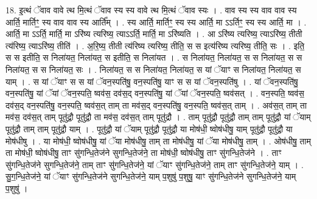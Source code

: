 \documentclass[17pt]{extarticle}
\begin{document}
18. इ॒त्थं ॅवाव वावे त्थ मि॒त्थं ॅवाव स्य स्य वावे त्थ मि॒त्थं ॅवाव स्यः । . वाव स्य स्य वाव वाव स्य आर्ति॒ मार्तिꣳ॒॒ स्य वाव वाव स्य आर्ति᳚म् । . स्य आर्ति॒ मार्तिꣳ॒॒ स्य स्य आर्ति॒ मा ऽऽर्तिꣳ॒॒ स्य स्य आर्ति॒ मा । . आर्ति॒ मा ऽऽर्ति॒ मार्ति॒ मा ऽरि॑ष्य त्यरिष्य॒ त्याऽऽर्ति॒ मार्ति॒ मा ऽरि॑ष्यति । . आ ऽरि॑ष्य त्यरिष्य॒ त्याऽरि॑ष्य॒ तीती त्य॑रिष्य॒ त्याऽरि॑ष्य॒ तीति॑ । . अ॒रि॒ष्य॒ तीती त्य॑रिष्य त्यरिष्य॒ तीति॒ स स इत्य॑रिष्य त्यरिष्य॒ तीति॒ सः । . इति॒ स स इतीति॒ स निला॑यत॒ निला॑यत॒ स इतीति॒ स निला॑यत । . स निला॑यत॒ निला॑यत॒ स स निला॑यत॒ स स निला॑यत॒ स स निला॑यत॒ सः । . निला॑यत॒ स स निला॑यत॒ निला॑यत॒ स यां ॅयाꣳ स निला॑यत॒ निला॑यत॒ स याम् । . स यां ॅयाꣳ स स यां ॅवन॒स्पति॑षु॒ वन॒स्पति॑षु॒ याꣳ स स यां ॅवन॒स्पति॑षु । . यां ॅवन॒स्पति॑षु॒ वन॒स्पति॑षु॒ यां ॅयां ॅवन॒स्पति॒ ष्वव॑स॒ दव॑स॒द् वन॒स्पति॑षु॒ यां ॅयां ॅवन॒स्पति॒ ष्वव॑सत् । . वन॒स्पति॒ ष्वव॑स॒ दव॑स॒द् वन॒स्पति॑षु॒ वन॒स्पति॒ ष्वव॑स॒त् ताम् ता मव॑स॒द् वन॒स्पति॑षु॒ वन॒स्पति॒ ष्वव॑स॒त् ताम् । . अव॑स॒त् ताम् ता मव॑स॒ दव॑स॒त् ताम् पूतु॑द्रौ॒ पूतु॑द्रौ॒ ता मव॑स॒ दव॑स॒त् ताम् पूतु॑द्रौ । . ताम् पूतु॑द्रौ॒ पूतु॑द्रौ॒ ताम् ताम् पूतु॑द्रौ॒ यां ॅयाम् पूतु॑द्रौ॒ ताम् ताम् पूतु॑द्रौ॒ याम् । . पूतु॑द्रौ॒ यां ॅयाम् पूतु॑द्रौ॒ पूतु॑द्रौ॒ या मोष॑धी॒ ष्वोष॑धीषु॒ याम् पूतु॑द्रौ॒ पूतु॑द्रौ॒ या मोष॑धीषु । . या मोष॑धी॒ ष्वोष॑धीषु॒ यां ॅया मोष॑धीषु॒ ताम् ता मोष॑धीषु॒ यां ॅया मोष॑धीषु॒ ताम् । . ओष॑धीषु॒ ताम् ता मोष॑धी॒ ष्वोष॑धीषु॒ ताꣳ सु॑गन्धि॒तेज॑ने सुगन्धि॒तेज॑ने॒ ता मोष॑धी॒
ष्वोष॑धीषु॒ ताꣳ सु॑गन्धि॒तेज॑ने । . ताꣳ सु॑गन्धि॒तेज॑ने सुगन्धि॒तेज॑ने॒ ताम् ताꣳ सु॑गन्धि॒तेज॑ने॒ यां ॅयाꣳ सु॑गन्धि॒तेज॑ने॒ ताम् ताꣳ सु॑गन्धि॒तेज॑ने॒ याम् । . सु॒ग॒न्धि॒तेज॑ने॒ यां ॅयाꣳ सु॑गन्धि॒तेज॑ने सुगन्धि॒तेज॑ने॒ याम् प॒शुषु॑ प॒शुषु॒ याꣳ सु॑गन्धि॒तेज॑ने सुगन्धि॒तेज॑ने॒ याम् प॒शुषु॑ । \newline
\end{document}
